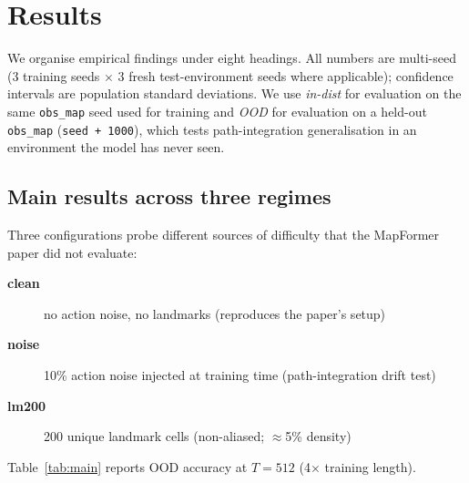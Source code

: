 \section{Results}
\label{sec:results}

We organise empirical findings under eight headings. All numbers are
multi-seed (3 training seeds $\times$ 3 fresh test-environment seeds
where applicable); confidence intervals are population standard
deviations. We use \emph{in-dist} for evaluation on the same
\texttt{obs\_map} seed used for training and \emph{OOD} for evaluation
on a held-out \texttt{obs\_map} (\texttt{seed + 1000}), which tests
path-integration generalisation in an environment the model has never
seen.

\subsection{Main results across three regimes}

Three configurations probe different sources of difficulty that the
MapFormer paper did not evaluate:
\begin{description}
  \item[\textbf{clean}] no action noise, no landmarks (reproduces the
  paper's setup)
  \item[\textbf{noise}] 10\% action noise injected at training time
  (path-integration drift test)
  \item[\textbf{lm200}] 200 unique landmark cells (non-aliased;
  $\approx$5\% density)
\end{description}

Table~\ref{tab:main} reports OOD accuracy at $T{=}512$ (4$\times$
training length).

